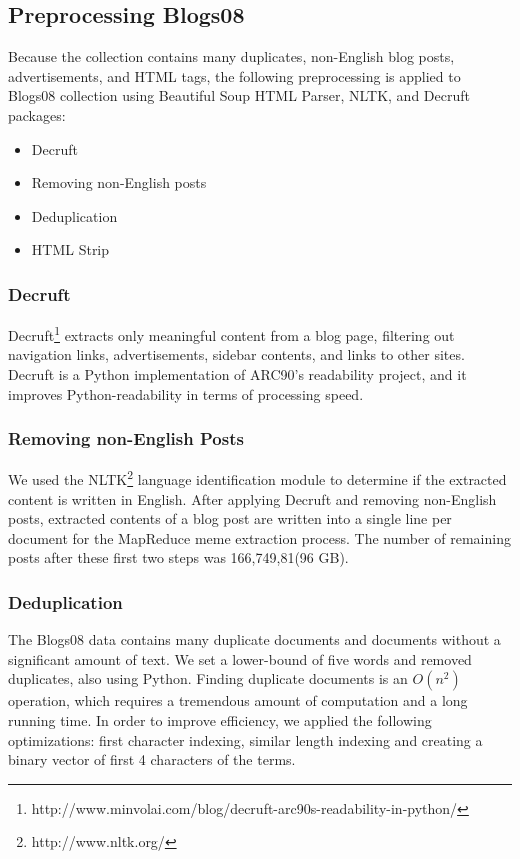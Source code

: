 \documentclass{sig-alternate}
\begin{document}
\subsection{Preprocessing Blogs08}

Because the collection contains many duplicates, non-English blog posts, advertisements, and HTML tags, the following preprocessing is applied to Blogs08 collection using Beautiful Soup HTML Parser, NLTK, and Decruft packages:

\begin{itemize}
\item Decruft
\item Removing non-English posts
\item Deduplication
\item HTML Strip
\end{itemize}


\subsubsection{Decruft}
Decruft\footnote{http://www.minvolai.com/blog/decruft-arc90s-readability-in-python/} extracts only meaningful content from a blog page, filtering out navigation links, advertisements, sidebar contents, and links to other sites. Decruft is a Python implementation of ARC90's readability project, and it improves Python-readability in terms of processing speed. 

\subsubsection{Removing non-English Posts}
We used the NLTK\footnote{http://www.nltk.org/} language identification module to determine if the extracted content is written in English. After applying Decruft and removing non-English posts, extracted contents of a blog post are written into a single line per document for the MapReduce meme extraction process. The number of remaining posts after these first two steps was 166,749,81(96 GB).

\subsubsection{Deduplication}
The Blogs08 data contains many duplicate documents and documents without a significant amount of text. We set a lower-bound of five words and removed duplicates, also using Python. Finding duplicate documents is an $O(n^2)$ operation, which requires a tremendous amount of computation and a long running time. In order to improve efficiency, we applied the following optimizations: first character indexing, similar length indexing and creating a binary vector of first 4 characters of the terms.
\end{document}
